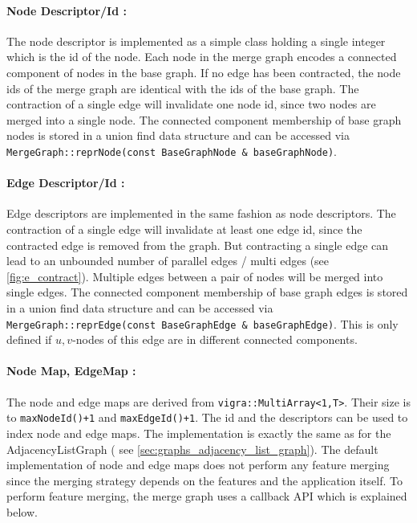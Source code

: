 \paragraph{Node Descriptor/Id :}
The node descriptor is implemented as a simple class
holding a single integer which is the id 
of the node.
Each node in the merge graph encodes a connected
component of nodes in the base graph.
If no edge has been contracted, the node ids
of the merge graph are identical with the ids 
of the base graph.
The contraction of a single edge will invalidate
one node id, since two nodes are merged into a single 
node.
The connected component membership of base graph
nodes is stored in a union find data structure 
and can be accessed via \lstinline{MergeGraph::reprNode(const BaseGraphNode & baseGraphNode)}.


\paragraph{Edge Descriptor/Id :}
Edge descriptors are implemented in the same fashion as node descriptors.
The contraction of a single edge will invalidate
at least one edge id, since the contracted edge is removed
from the graph.
But contracting a single edge can lead to an
unbounded number of parallel edges / multi edges (see \cref{fig:e_contract}).
Multiple edges between a pair of nodes will be merged
into single edges.
The connected component membership of base graph
edges is stored in a union find data structure 
and can be accessed via \lstinline{MergeGraph::reprEdge(const BaseGraphEdge & baseGraphEdge)}.
This is only defined if $u,v$-nodes of this edge are in different connected components.



\paragraph{Node Map, EdgeMap :} 
The node and edge maps are derived from \lstinline{vigra::MultiArray<1,T>}.
Their size is to \lstinline{maxNodeId()+1} and  \lstinline{maxEdgeId()+1}.
The id and the descriptors can be used to index node and edge maps.
The implementation is exactly the same as for the AdjacencyListGraph ( see \cref{sec:graphs_adjacency_list_graph}).
The default implementation of node and edge maps does not perform 
any feature merging since the merging strategy depends on the
features and the application itself.
To perform feature merging, the merge graph uses a callback API which is explained below.


